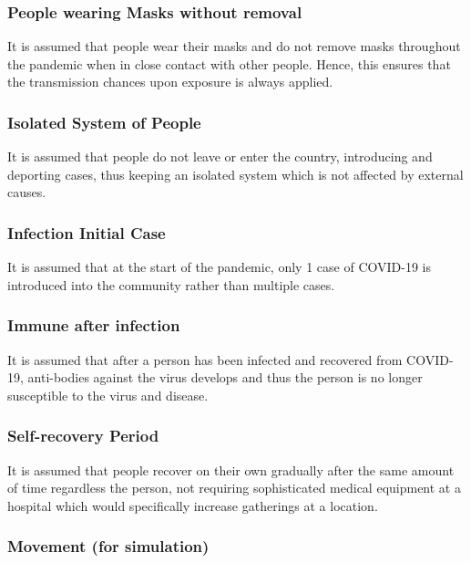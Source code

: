\documentclass[a4paper,titlepage]{article}
\begin{document}
\subsubsection{People wearing Masks without removal}

It is assumed that people wear their masks and do not remove masks throughout the pandemic when in close contact with other people. Hence, this ensures that the transmission chances upon exposure is always applied.

\subsubsection{Isolated System of People}

It is assumed that people do not leave or enter the country, introducing and deporting cases, thus keeping an isolated system which is not affected by external causes.

\subsubsection{Infection Initial Case}

It is assumed that at the start of the pandemic, only 1 case of COVID-19 is introduced into the community rather than multiple cases.

\subsubsection{Immune after infection}

It is assumed that after a person has been infected and recovered from COVID-19, anti-bodies against the virus develops and thus the person is no longer susceptible to the virus and disease.

\subsubsection{Self-recovery Period}

It is assumed that people recover on their own gradually after the same amount of time regardless the person, not requiring sophisticated medical equipment at a hospital which would specifically increase gatherings at a location. 

\subsubsection{Movement (for simulation)}
\end{document}
